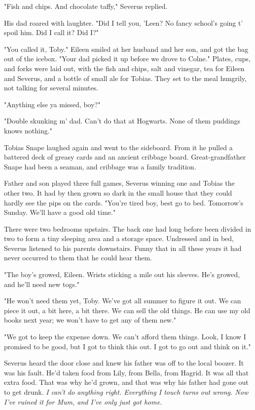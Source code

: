 "Fish and chips. And chocolate taffy," Severus replied.

His dad roared with laughter. "Did I tell you, 'Leen? No fancy school's going t' spoil him. Did I call it? Did I?"

"You called it, Toby." Eileen smiled at her husband and her son, and got the bag out of the icebox. "Your dad picked it up before we drove to Colne." Plates, cups, and forks were laid out, with the fish and chips, salt and vinegar, tea for Eileen and Severus, and a bottle of small ale for Tobias. They set to the meal hungrily, not talking for several minutes.

"Anything else ya missed, boy?"

"Double skunking m' dad. Can't do that at Hogwarts. None of them puddings knows nothing."

Tobias Snape laughed again and went to the sideboard. From it he pulled a battered deck of greasy cards and an ancient cribbage board. Great-grandfather Snape had been a seaman, and cribbage was a family tradition.

Father and son played three full games, Severus winning one and Tobias the other two. It had by then grown so dark in the small house that they could hardly see the pips on the cards. "You're tired boy, best go to bed. Tomorrow's Sunday. We'll have a good old time."

There were two bedrooms upstairs. The back one had long before been divided in two to form a tiny sleeping area and a storage space. Undressed and in bed, Severus listened to his parents downstairs. Funny that in all these years it had never occurred to them that he could hear them.

"The boy's growed, Eileen. Wrists sticking a mile out his sleeves. He's growed, and he'll need new togs."

"He won't need them yet, Toby. We've got all summer to figure it out. We can piece it out, a bit here, a bit there. We can sell the old things. He can use my old books next year; we won't have to get any of them new."

"We got to keep the expense down. We can't afford them things. Look, I know I promised to be good, but I got to think this out. I got to go out and think on it."

Severus heard the door close and knew his father was off to the local boozer. It was his fault. He'd taken food from Lily, from Bella, from Hagrid. It was all that extra food. That was why he'd grown, and that was why his father had gone out to get drunk. \emph{I can't do anything right. Everything I touch turns out wrong. Now I've ruined it for Mum, and I've only just got home.}

